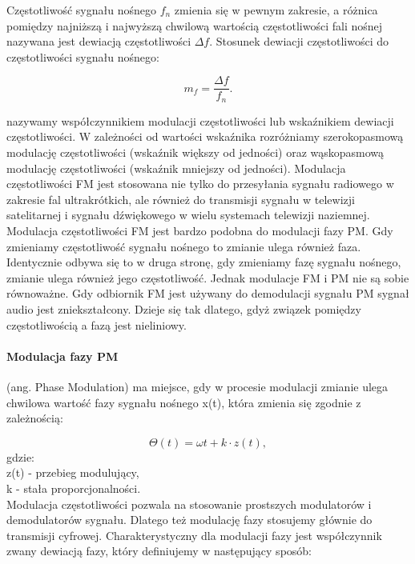 \documentclass[a4paper,twoside]{report}
\begin{document}
Częstotliwość sygnału nośnego $f_n$ zmienia się w pewnym zakresie, a różnica pomiędzy najniższą i najwyższą chwilową wartością częstotliwości fali nośnej nazywana jest dewiacją częstotliwości $\Delta f$. Stosunek dewiacji częstotliwości do częstotliwości sygnału nośnego:

\begin{equation}
 m_f=\dfrac{\Delta f}{f_n}. 
\end{equation}

nazywamy współczynnikiem modulacji częstotliwości lub wskaźnikiem dewiacji częstotliwości. W zależności od wartości wskaźnika rozróżniamy szerokopasmową modulację częstotliwości (wskaźnik większy od jedności) oraz wąskopasmową modulację częstotliwości (wskaźnik mniejszy od jedności). Modulacja częstotliwości FM jest stosowana nie tylko do przesyłania sygnału radiowego w zakresie fal ultrakrótkich, ale również do transmisji sygnału w telewizji satelitarnej i sygnału dźwiękowego w wielu systemach telewizji naziemnej. Modulacja częstotliwości FM jest bardzo podobna do modulacji fazy PM. Gdy zmieniamy częstotliwość sygnału nośnego to zmianie ulega również faza. Identycznie odbywa się to w druga stronę, gdy zmieniamy fazę sygnału nośnego, zmianie ulega również jego częstotliwość. Jednak modulacje FM i PM nie są sobie równoważne. Gdy odbiornik FM jest używany do demodulacji sygnału PM sygnał audio jest zniekształcony. Dzieje się tak dlatego, gdyż związek pomiędzy częstotliwością a fazą jest nieliniowy. 

\paragraph{Modulacja fazy PM} (ang. Phase Modulation) ma miejsce, gdy w procesie modulacji zmianie ulega chwilowa wartość fazy sygnału nośnego x(t), która zmienia się zgodnie z zależnością:

\begin{equation}
\Theta (t)=\omega t+k\cdot z(t),
\end{equation}
gdzie: \\
z(t) - przebieg modulujący,\\
k - stała proporcjonalności. \\

Modulacja częstotliwości pozwala na stosowanie prostszych modulatorów i demodulatorów sygnału. Dlatego też modulację fazy stosujemy głównie do transmisji cyfrowej. Charakterystyczny dla modulacji fazy jest współczynnik zwany dewiacją fazy, który definiujemy w następujący sposób:
\end{document}
